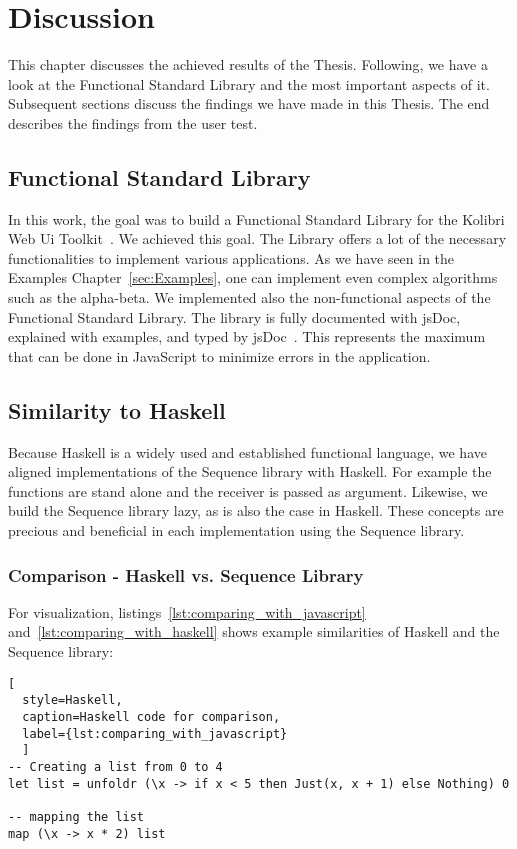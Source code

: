\section{Discussion}
\label{sec:Discussion}
This chapter discusses the achieved results of the Thesis. Following, we have a look at the
Functional Standard Library and the most important aspects of it. Subsequent sections
discuss the findings we have made in this Thesis. The end describes the
findings from the user test. 

\subsection{Functional Standard Library}
\label{sub:Functional Standard Library}
In this work, the goal was to build a Functional Standard Library for the
Kolibri Web Ui Toolkit~\cite{kolibri}. We achieved
this goal. The Library offers a lot of the necessary functionalities to implement
various applications. As we have seen in the Examples Chapter~\ref{sec:Examples}, one can implement
even complex algorithms such as the alpha-beta. We implemented also the
non-functional aspects of the Functional Standard Library. The library is fully
documented with jsDoc, explained with examples, and typed by jsDoc~\cite{jsdoc_use_2023}. 
This represents the maximum that can
be done in JavaScript to minimize errors in the application.

\subsection{Similarity to Haskell}
\label{sub:Similarity to Haskell}
Because Haskell is a widely used and established functional language, we have
aligned implementations of the Sequence library with Haskell. For
example the functions are stand alone and the receiver is passed as argument. 
Likewise, we build the Sequence library lazy, as is also the case in Haskell. 
These concepts are precious and beneficial in each implementation using the Sequence library.

\subsubsection{Comparison - Haskell vs. Sequence Library}
\label{Comparion - Haskell vs. Sequence Library}
For visualization, listings~\ref{lst:comparing_with_javascript} and~\ref{lst:comparing_with_haskell} 
shows example similarities of Haskell and the Sequence library:

\begin{lstlisting}[
  style=Haskell, 
  caption=Haskell code for comparison, 
  label={lst:comparing_with_javascript}
  ]
-- Creating a list from 0 to 4
let list = unfoldr (\x -> if x < 5 then Just(x, x + 1) else Nothing) 0

-- mapping the list
map (\x -> x * 2) list 
\end{lstlisting}


